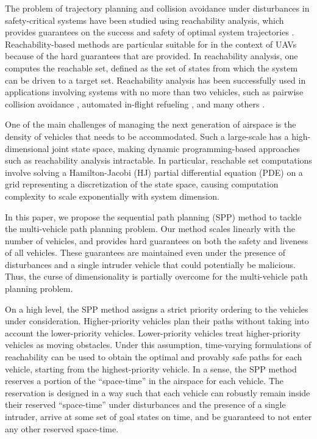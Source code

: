 The problem of trajectory planning and collision avoidance under disturbances in safety-critical systems have been studied using reachability analysis, which provides guarantees on the success and safety of optimal system trajectories \cite{Barron90, Mitchell05, Bokanowski10, Bokanowski11, Margellos11, Fisac15}. Reachability-based methods are particular suitable for in the context of UAVs because of the hard guarantees that are provided. In reachability analysis, one computes the reachable set, defined as the set of states from which the system can be driven to a target set. Reachability analysis has been successfully used in applications involving systems with no more than two vehicles, such as pairwise collision avoidance \cite{Mitchell05}, automated in-flight refueling \cite{Ding08}, and many others \cite{Huang11, Bayen07}. 

One of the main challenges of managing the next generation of airspace is the density of vehicles that needs to be accommodated. Such a large-scale has a high-dimensional joint state space, making dynamic programming-based approaches such as reachability analysis intractable. In particular, reachable set computations involve solving a Hamilton-Jacobi (HJ) partial differential equation (PDE) on a grid representing a discretization of the state space, causing computation complexity to scale exponentially with system dimension. 

In this paper, we propose the sequential path planning (SPP) method to tackle the multi-vehicle path planning problem. Our method scales linearly with the number of vehicles, and provides hard guarantees on both the safety and liveness of all vehicles. These guarantees are maintained even under the presence of disturbances and a single intruder vehicle that could potentially be malicious. Thus, the curse of dimensionality is partially overcome for the multi-vehicle path planning problem. 

On a high level, the SPP method assigns a strict priority ordering to the vehicles under consideration. Higher-priority vehicles plan their paths without taking into account the lower-priority vehicles. Lower-priority vehicles treat higher-priority vehicles as moving obstacles. Under this assumption, time-varying formulations of reachability \cite{Bokanowski11, Fisac15} can be used to obtain the optimal and provably safe paths for each vehicle, starting from the highest-priority vehicle. In a sense, the SPP method reserves a portion of the ``space-time'' in the airspace for each vehicle. The reservation is designed in a way such that each vehicle can robustly remain inside their reserved ``space-time'' under disturbances and the presence of a single intruder, arrive at some set of goal states on time, and be guaranteed to not enter any other reserved space-time.

